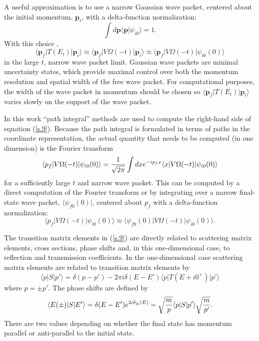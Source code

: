 \documentclass[aps,prc,reprint,noshowpacs,groupedaddress,onecolumn]{revtex4}
\def\beq{\begin{equation}}
\def\eeq{\end{equation}}
\begin{document}
A useful approximation is to use a narrow Gaussian wave packet, centered 
about the initial momentum, $\mathbf{p}_i$, with a delta-function normalization:
\beq
\int d\mathbf{p} \langle \mathbf{p} \vert \psi_{i0}\rangle =1 .
\label{s.8}
\eeq
With this choice \cite{Lippmann}, 
\beq
\langle \mathbf{p}_f \vert T(E_i) \vert \mathbf{p}_i \rangle
 \approx
\langle \mathbf{p}_f \vert V \Omega (-t) \vert \mathbf{p}_i \rangle
\approx
\langle \mathbf{p}_f \vert V \Omega (-t) \vert \psi_{i0}(0) \rangle
\label{s.9}
\eeq
in the large $t$, narrow wave packet limit.  Gaussian wave packets are
minimal uncertainty states, which provide maximal control over both
the momentum resolution and spatial width of the free wave packet.
For computational purposes, the width of the wave packet in momentum
should be chosen so
$\langle \mathbf{p}_f \vert T(E_i) \vert \mathbf{p}_i \rangle$ varies
slowly on the support of the wave packet.

In this work ``path integral'' methods are used to compute the
right-hand side of equation (\ref{s.9}).  Because the path integral is
formulated in terms of paths in the coordinate representation, the
actual quantity that needs to be computed (in one dimension) is the Fourier
transform
\beq
\langle {p}_f \vert V \Omega (-t) \vert \psi_{i0}(0) \rangle =
{1 \over \sqrt{2 \pi}}
\int dx e^{-ip_fx} \langle {x} \vert V \Omega (-t) \vert \psi_{i0}(0) \rangle
\label{s.10}
\eeq
for a sufficiently large $t$ and narrow wave packet.  This can be
computed by a direct computation of the Fourier transform or by
integrating over a narrow final-state wave packet,
$\langle \psi_{f0}(0) \vert$, centered about ${p}_f$ with a
delta-function normalization:
\beq
\langle {p}_f \vert V \Omega (-t) \vert \psi_{i0}(0) \rangle \approx 
\langle \psi_{f0}(0) \vert V \Omega (-t) \vert \psi_{i0}(0) \rangle .
\label{s.11}
\eeq

The transition matrix elements in (\ref{s.9}) are directly related to 
scattering matrix elements,  cross sections,
phase shifts and, in this one-dimensional case,
to reflection and transmission coefficients.  In the 
one-dimensional case scattering matrix elements
are related to transition matrix elements by
\beq
\langle p \vert S \vert p' \rangle =
\delta (p-p') - 2 \pi i \delta (E-E') 
\langle p \vert T(E+i0^+) \vert p' \rangle  
\label{s.12}
\eeq
where $p=\pm p'$.
The phase shifts are defined by
\beq
\langle E(\pm) \vert S \vert E'\rangle = \delta (E-E') e^{2 i \delta_{\pm} (E)}
= \sqrt{{m \over p}} \langle p \vert S \vert p' \rangle  \sqrt{{m \over p'}}
.
\label{s.13}
\eeq
There are two values 
depending on whether the final state has momentum parallel or anti-parallel
to the initial state.
\end{document}
